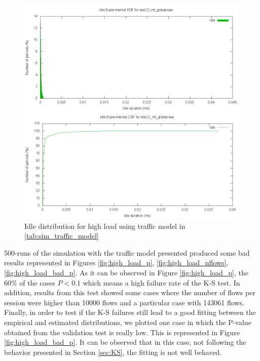 \begin{figure}[h!]
	\centering
	\includegraphics[scale=0.28, trim = 0mm 0mm 6mm 180mm, clip]{images/results/GlobalView/flows/high_load/idle_cdf}
	\caption{Idle distribution for high load using traffic model in \ref{tab:sim_traffic_model}}
	\label{fig:high_load_idlecdf}
\end{figure}

500-runs of the simulation with the traffic model presented produced some bad results represented in Figures \ref{fig:high_load_p}, \ref{fig:high_load_nflows}, \ref{fig:high_load_bad_p}. As it can be observed in Figure \ref{fig:high_load_p}, the 60\% of the cases $P<0.1$ which means a high failure rate of the \acs{K-S} test. In addition, results from this test showed some cases where the number of flows per session were higher than 10000 flows and a particular case with 143061 flows. Finally, in order to test if the \acs{K-S} failures still lead to a good fitting between the empirical and estimated distributions, we plotted one case in which the P-value obtained from the validation test is really low. This is represented in Figure \ref{fig:high_load_bad_p}. It can be observed that in this case, not following the behavior presented in Section \ref{sec:KS}, the fitting is not well behaved.


